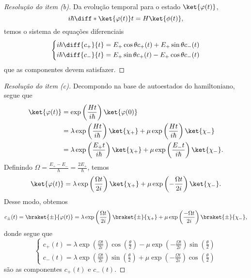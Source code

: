 \begin{proof}[Resolução do item (b)]
    Da evolução temporal para o estado \(\ket{\varphi(t)}\),
    \begin{equation*}
        i \hbar \diff*{\ket{\varphi(t)}}{t} = H \ket{\phi(t)},
    \end{equation*}
    temos o sistema de equações diferenciais
    \begin{equation*}
        \left\{
        \begin{aligned}
            i\hbar \diff{c_+}{t} = E_+ \cos\theta c_+(t) + E_+ \sin\theta c_-(t)\\
            i\hbar \diff{c_-}{t} = E_+ \sin\theta c_+(t) - E_+ \cos\theta c_-(t)
        \end{aligned}\right.
    \end{equation*}
    que as componentes devem satisfazer.
\end{proof}
\begin{proof}[Resolução do item (c)]
    Decompondo na base de autoestados do hamiltoniano, segue que
    \begin{align*}
        \ket{\varphi(t)} &= \exp\left(\frac{Ht}{i\hbar}\right)\ket{\varphi(0)}\\
                         &= \lambda\exp\left(\frac{Ht}{i\hbar}\right)\ket{\chi_+} + \mu\exp\left(\frac{Ht}{i\hbar}\right)\ket{\chi_-}\\
                         &= \lambda\exp\left(\frac{E_+t}{i\hbar}\right)\ket{\chi_+} + \mu\exp\left(\frac{E_-t}{i\hbar}\right)\ket{\chi_-}.
    \end{align*}
    Definindo \(\Omega = \frac{E_+ - E_-}{\hbar} = \frac{2E_+}{\hbar}\), temos
    \begin{equation*}
        \ket{\varphi(t)} = \lambda\exp\left(\frac{\Omega t}{2i}\right)\ket{\chi_+} + \mu\exp\left(-\frac{\Omega t}{2i}\right)\ket{\chi_-}.
    \end{equation*}
    Desse modo, obtemos
    \begin{equation*}
        c_\pm(t) = \braket{\pm}{\varphi(t)} = \lambda\exp\left(\frac{\Omega t}{2i}\right)\braket{\pm}{\chi_+} + \mu\exp\left(\frac{-\Omega t}{2i}\right)\braket{\pm}{\chi_-},
    \end{equation*}
    donde segue que
    \begin{equation*}
        \left\{
        \begin{aligned}
            c_+(t) = \lambda\exp\left(\frac{\Omega t}{2i}\right)\cos\left(\frac\theta2\right) - \mu\exp\left(-\frac{\Omega t}{2i}\right)\sin\left(\frac\theta2\right)\\
            c_-(t) = \lambda\exp\left(\frac{\Omega t}{2i}\right)\sin\left(\frac\theta2\right) + \mu\exp\left(-\frac{\Omega t}{2i}\right)\cos\left(\frac\theta2\right)
        \end{aligned}\right.
    \end{equation*}
    são as componentes \(c_+(t)\) e \(c_-(t)\).
\end{proof}
